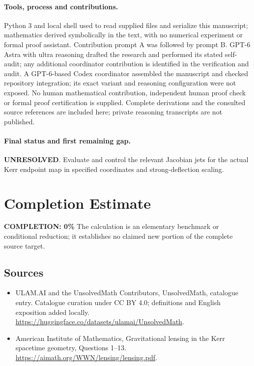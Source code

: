\documentclass[11pt]{article}
\begin{document}
\paragraph{Tools, process and contributions.}
Python 3 and local shell used to read supplied files and serialize this manuscript; mathematics derived symbolically in the text, with no numerical experiment or formal proof assistant. Contribution prompt A was followed by prompt B. GPT-6 Astra with ultra reasoning drafted the research and performed its stated self-audit; any additional coordinator contribution is identified in the verification and audit. A GPT-6-based Codex coordinator assembled the manuscript and checked repository integration; its exact variant and reasoning configuration were not exposed. No human mathematical contribution, independent human proof check or formal proof certification is supplied. Complete derivations and the consulted source references are included here; private reasoning transcripts are not published.

\paragraph{Final status and first remaining gap.}
\textbf{UNRESOLVED}. Evaluate and control the relevant Jacobian jets for the actual Kerr endpoint map in specified coordinates and strong-deflection scaling.

\section{Completion Estimate}
\noindent\textbf{COMPLETION: 0\%}
The calculation is an elementary benchmark or conditional reduction; it establishes no claimed new portion of the complete source target.

\subsection{Sources}
\begin{itemize}
\item[\hypertarget{source:statement:1}{S1}] ULAM.AI and the UnsolvedMath Contributors, UnsolvedMath, catalogue entry. Catalogue curation under CC BY 4.0; definitions and English exposition added locally.
\url{https://huggingface.co/datasets/ulamai/UnsolvedMath}.
\item[\hypertarget{source:statement:2}{S2}] American Institute of Mathematics, Gravitational lensing in the Kerr spacetime geometry, Questions 1–13.
\url{https://aimath.org/WWN/lensing/lensing.pdf}.
\end{itemize}
\label{end:statement}
\end{document}
